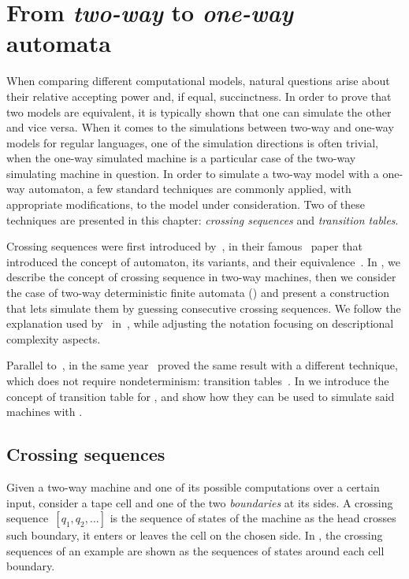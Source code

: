 \chapter{From \emph{two-way} to \emph{one-way} automata}\label{ch:techniques}
When comparing different computational models, natural questions arise about their relative accepting power and, if equal, succinctness.
In order to prove that two models are equivalent, it is typically shown that one can simulate the other and vice versa.
When it comes to the simulations between two-way and one-way models for regular languages, one of the simulation directions is often trivial, when the one-way simulated machine is a particular case of the two-way simulating machine in question.
In order to simulate a two-way model with a one-way automaton, a few standard techniques are commonly applied, with appropriate modifications, to the model under consideration.
Two of these techniques are presented in this chapter: \emph{crossing sequences} and \emph{transition tables}.

Crossing sequences were first introduced by~\citeauthor{RabSco59}, in their famous~\citeyear{RabSco59} paper that introduced the concept of automaton, its variants, and their equivalence~\cite{RabSco59}.
In , we describe the concept of crossing sequence in two-way machines, then we consider the case of two-way deterministic finite automata (\TDFAs) and present a construction that lets \ONFAs simulate them by guessing consecutive crossing sequences.
We follow the explanation used by~\citeauthor{HopUll79} in~\cite{HopUll79}, while adjusting the notation focusing on descriptional complexity aspects.

Parallel to~\citeauthor{RabSco59}, in the same year~\citeauthor{She59} proved the same result with a different technique, which does not require nondeterminism: transition tables~\cite{She59}.
In  we introduce the concept of transition table for \TDFAs, and show how they can be used to simulate said machines with \ODFAs.


\section{Crossing sequences}\label{sec:crossseq2DFA}
Given a two-way machine and one of its possible computations over a certain input, consider a tape cell and one of the two \emph{boundaries} at its sides.
A crossing sequence~$[q_1,q_2,\dots]$ is the sequence of states of the machine as the head crosses such boundary, \ie it enters or leaves the cell on the chosen side.
In , the crossing sequences of an example \TDFA are shown as the sequences of states around each cell boundary.

